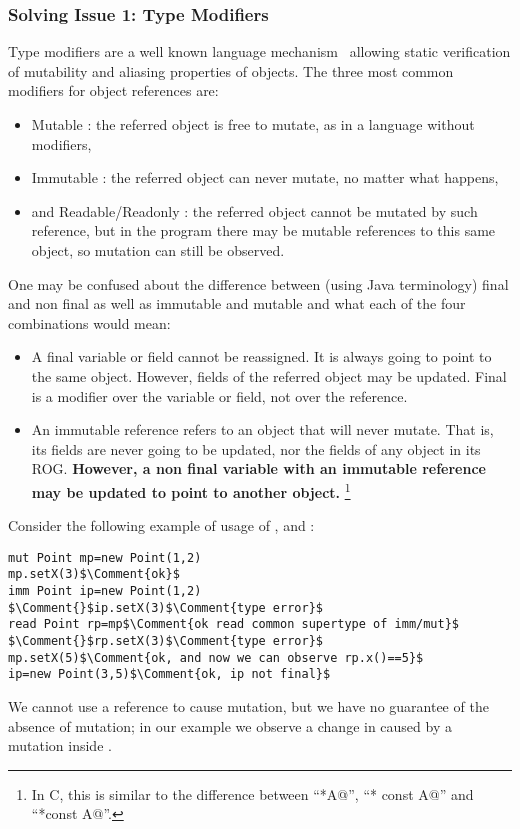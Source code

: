 \subsubsection*{Solving Issue 1: Type Modifiers}
\saveSpace
Type modifiers are a well known language mechanism~\cite{TschantzErnst05,BirkaErnst04,OstlundEtAl08,clebsch2015deny,GianniniEtAl16,GordonEtAl12} allowing static verification of mutability and aliasing properties of objects.
The three most common modifiers for object references are:
\begin{itemize}
\item Mutable \Q@mut@: the referred object is free to mutate, as in a language without modifiers,
\item Immutable \Q@imm@: the referred object can never mutate, no matter what happens,
\item and Readable/Readonly \Q@read@: the referred object cannot be mutated by such reference, but in the program there may be mutable references to this same object, so mutation can still be observed. 
\end{itemize}
\noindent
One may be confused about the difference between (using Java terminology) final and non final as well as immutable and mutable and what each of the four combinations would mean:
\begin{itemize}
\item A final variable or field cannot be reassigned.
It is always going to point to the same object.
However, fields of the referred object may be updated.
Final is a modifier over the variable or field, not over the reference.
\item An immutable reference refers to an object that will never mutate.
That is, its fields are never going to be updated, nor the fields of any object in its ROG.
\textbf{However, a non final variable with an immutable reference may be updated to point to another object.}%
\footnote{In C, this is similar to the difference between ``\Q@const *A@'', ``\Q@* const A@'' and ``\Q@const *const A@''.}
\end{itemize}
\noindent Consider the following  example of usage of \Q@mut@, \Q@imm@ and \Q@read@:
\begin{lstlisting}
mut Point mp=new Point(1,2)
mp.setX(3)$\Comment{ok}$
imm Point ip=new Point(1,2)
$\Comment{}$ip.setX(3)$\Comment{type error}$
read Point rp=mp$\Comment{ok read common supertype of imm/mut}$
$\Comment{}$rp.setX(3)$\Comment{type error}$
mp.setX(5)$\Comment{ok, and now we can observe rp.x()==5}$
ip=new Point(3,5)$\Comment{ok, ip not final}$
\end{lstlisting}
\noindent We cannot use a \Q@read@ reference to cause mutation, but we have no guarantee of the absence of mutation; in our example we observe a change in \Q@rp@ caused by a mutation inside \Q@mp@.
 
